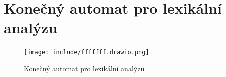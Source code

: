 \documentclass[a4paper, 11pt]{article}
\begin{document}
\newpage
\section*{Konečný automat pro lexikální analýzu}
\label{sec:fa}
\begin{figure}[!ht]
	\centering
	\vspace{-0.8cm}
	\texttt{[image: include/fffffff.drawio.png]}
	\caption{Konečný automat pro lexikální analýzu}
	\label{fig:fa}
\end{figure}
\end{document}
